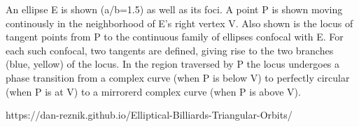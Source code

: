An ellipse E is shown (a/b=1.5) as well as its foci. A point P is shown moving continously in the neighborhood of E's right vertex V. Also shown is the locus of tangent points from P to the continuous family of ellipses confocal with E. For each such confocal, two tangents are defined, giving rise to the two branches (blue, yellow) of the locus.  In the region traversed by P the locus undergoes a phase transition from a complex curve (when P is below V) to perfectly circular (when P is at V)  to a mirrorerd complex curve (when P is above V).

https://dan-reznik.github.io/Elliptical-Billiards-Triangular-Orbits/